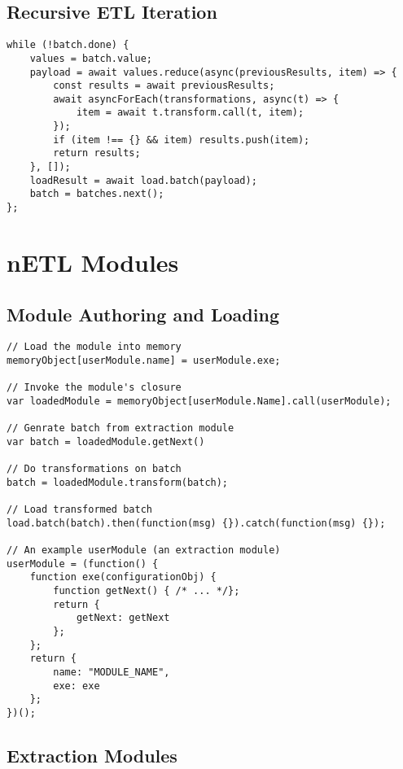 \subsection{Recursive ETL Iteration}
\label{netl-task-iterator}
\begin{verbatim}
while (!batch.done) {
    values = batch.value;
    payload = await values.reduce(async(previousResults, item) => {
        const results = await previousResults;
        await asyncForEach(transformations, async(t) => {
            item = await t.transform.call(t, item);
        });
        if (item !== {} && item) results.push(item);
        return results;
    }, []);
    loadResult = await load.batch(payload);
    batch = batches.next();
};
\end{verbatim}

\section{nETL Modules}
\label{netl-modules}

\subsection{Module Authoring and Loading}
\label{netl-module-loading}
\begin{verbatim}
// Load the module into memory
memoryObject[userModule.name] = userModule.exe;

// Invoke the module's closure
var loadedModule = memoryObject[userModule.Name].call(userModule);

// Genrate batch from extraction module
var batch = loadedModule.getNext()

// Do transformations on batch
batch = loadedModule.transform(batch);

// Load transformed batch
load.batch(batch).then(function(msg) {}).catch(function(msg) {});

// An example userModule (an extraction module)
userModule = (function() {
    function exe(configurationObj) {
        function getNext() { /* ... */};
        return {
            getNext: getNext
        };
    };
    return {
        name: "MODULE_NAME",
        exe: exe
    };
})();
\end{verbatim}


\subsection{Extraction Modules}
